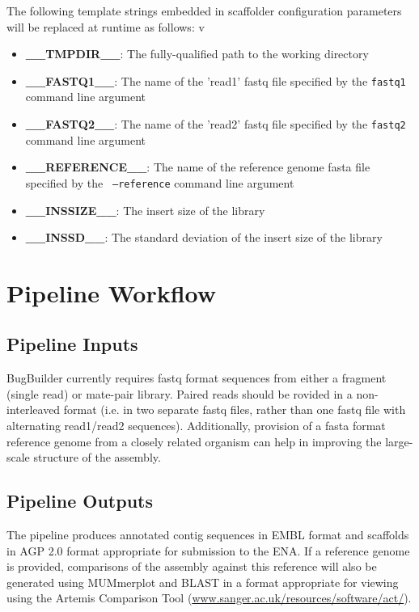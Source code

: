 \documentclass[a4paper,10pt]{article}
\begin{document}
The following template strings embedded in scaffolder configuration parameters will be replaced at runtime as
follows:
v
\begin{itemize}
\item {\bf \_\_TMPDIR\_\_}: The fully-qualified path to the working directory
\item {\bf \_\_FASTQ1\_\_}: The name of the 'read1' fastq file specified by the {\tt fastq1}
command line argument
\item {\bf \_\_FASTQ2\_\_}: The name of the 'read2' fastq file specified by the {\tt fastq2}
command line argument
\item {\bf \_\_REFERENCE\_\_}: The name of the reference genome fasta file specified by the {\tt
--reference} command line argument
\item {\bf \_\_INSSIZE\_\_}: The insert size of the library
\item {\bf \_\_INSSD\_\_}: The standard deviation of the insert size of the library
\end{itemize}

\section{Pipeline Workflow}

\subsection{Pipeline Inputs}

BugBuilder currently requires fastq format sequences from either a fragment (single read) or
mate-pair library. Paired reads should be rovided in a non-interleaved format (i.e. in two separate
fastq files, rather than one fastq file with alternating read1/read2 sequences). Additionally,
provision of a fasta format reference genome from a closely related organism can help in improving
the large-scale structure of the assembly.

\subsection{Pipeline Outputs}

The pipeline produces annotated contig sequences in EMBL format and scaffolds in AGP 2.0 format
appropriate for submission to the ENA. If a reference genome is provided, comparisons of the assembly
against this reference will also be generated using MUMmerplot and BLAST in a format appropriate
for viewing using the Artemis Comparison Tool (\url{www.sanger.ac.uk/resources/software/act/}). 
\end{document}
